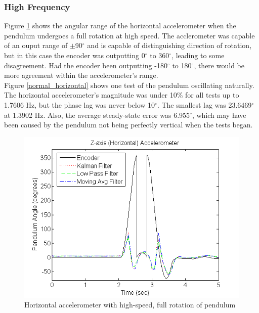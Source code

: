 \documentclass{article}
\theoremstyle{plain}
\theoremstyle{definition}
\theoremstyle{remark}
\begin{document}
\subsubsection{High Frequency}

Figure \ref{full_horizontal} shows the angular range of the horizontal accelerometer when the pendulum undergoes a full rotation at high speed. The acclerometer was capable of an ouput range of $\pm$90$^{\circ}$ and is capable of distinguishing direction of rotation, but in this case the encoder was outputting 0$^{\circ}$ to 360$^{\circ}$, leading to some disagreement. Had the encoder been outputting -180$^{\circ}$ to 180$^{\circ}$, there would be more agreement within the accelerometer's range.\\

Figure \ref{normal_horizontal} shows one test of the pendulum oscillating naturally. The horizontal accelerometer's magnitude was under 10\% for all tests up to 1.7606 Hz, but the phase lag was never below 10$^{\circ}$. The smallest lag was 23.6469$^{\circ}$ at 1.3902 Hz. Also, the average steady-state error was 6.955$^{\circ}$, which may have been caused by the pendulum not being perfectly vertical when the tests began.\\ 

\begin{figure}[hbt]
\begin{center}
\includegraphics[width = 12cm]{FullRotation_Horizontal.png}
\caption{Horizontal accelerometer with high-speed, full rotation of pendulum}
\label{full_horizontal}
\end{center}
\end{figure}
\end{document}

